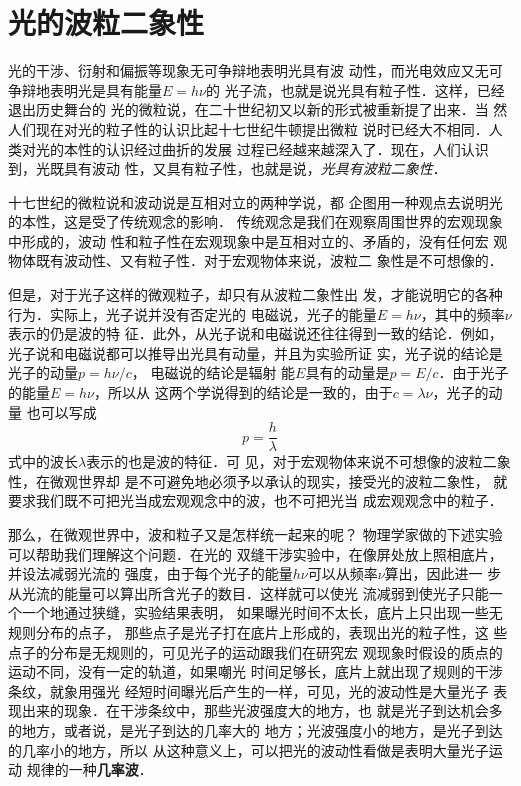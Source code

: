 \section{光的波粒二象性}
光的干涉、衍射和偏振等现象无可争辩地表明光具有波
动性，而光电效应又无可争辩地表明光是具有能量$E=h\nu$的
光子流，也就是说光具有粒子性．这样，已经退出历史舞台的
光的微粒说，在二十世纪初又以新的形式被重新提了出来．当
然人们现在对光的粒子性的认识比起十七世纪牛顿提出微粒
说时已经大不相同．人类对光的本性的认识经过曲折的发展
过程已经越来越深入了．现在，人们认识到，光既具有波动
性，又具有粒子性，也就是说，\textit{光具有波粒二象性}．

十七世纪的微粒说和波动说是互相对立的两种学说，都
企图用一种观点去说明光的本性，这是受了传统观念的影响．
传统观念是我们在观察周围世界的宏观现象中形成的，波动
性和粒子性在宏观现象中是互相对立的、矛盾的，没有任何宏
观物体既有波动性、又有粒子性．对于宏观物体来说，波粒二
象性是不可想像的．

但是，对于光子这样的微观粒子，却只有从波粒二象性出
发，才能说明它的各种行为．实际上，光子说并没有否定光的
电磁说，光子的能量$E=h\nu$，其中的频率$\nu$表示的仍是波的特
征．此外，从光子说和电磁说还往往得到一致的结论．例如，
光子说和电磁说都可以推导出光具有动量，并且为实验所证
实，光子说的结论是光子的动量$p=h\nu/c$，
电磁说的结论是辐射
能$E$具有的动量是$p=E/c$．由于光子的能量$E=h\nu$，所以从
这两个学说得到的结论是一致的，由于$c=\lambda\nu$，光子的动量
也可以写成
$$p=\frac{h}{\lambda}$$
式中的波长$\lambda$表示的也是波的特征．可
见，对于宏观物体来说不可想像的波粒二象性，在微观世界却
是不可避免地必须予以承认的现实，接受光的波粒二象性，
就要求我们既不可把光当成宏观观念中的波，也不可把光当
成宏观观念中的粒子．

那么，在微观世界中，波和粒子又是怎样统一起来的呢？
物理学家做的下述实验可以帮助我们理解这个问题．在光的
双缝干涉实验中，在像屏处放上照相底片，并设法减弱光流的
强度，由于每个光子的能量$h\nu$可以从频率$\nu$算出，因此进一
步从光流的能量可以算出所含光子的数目．这样就可以使光
流减弱到使光子只能一个一个地通过狭缝，实验结果表明，
如果曝光时间不太长，底片上只出现一些无规则分布的点子，
那些点子是光子打在底片上形成的，表现出光的粒子性，这
些点子的分布是无规则的，可见光子的运动跟我们在研究宏
观现象时假设的质点的运动不同，没有一定的轨道，如果嘲光
时间足够长，底片上就出现了规则的干涉条纹，就象用强光
经短时间曝光后产生的一样，可见，光的波动性是大量光子
表现出来的现象．在干涉条纹中，那些光波强度大的地方，也
就是光子到达机会多的地方，或者说，是光子到达的几率大的
地方；光波强度小的地方，是光子到达的几率小的地方，所以
从这种意义上，可以把光的波动性看做是表明大量光子运动
规律的一种\textbf{几率波}．

